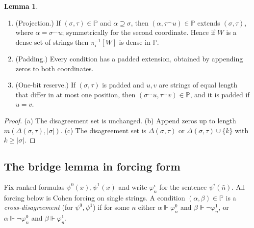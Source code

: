 \documentclass[11pt,letterpaper]{article}
\theoremstyle{definition}
\newtheorem{lemma}[definition]{Lemma}
\numberwithin{equation}{section}
\newcommand{\cat}{\mathbin{{}^\frown}}
\newcommand{\forces}{\Vdash}
\newcommand{\PP}{\mathbb P}
\begin{document}
\begin{lemma}\label{lem:forcingbasic}
\begin{enumerate}[label=\textup{(\alph*)}]
\item \textup{(Projection.)} If $(\sigma,\tau)\in\PP$ and $\alpha\supseteq\sigma$, then $(\alpha,\tau\cat u)\in\PP$ extends $(\sigma,\tau)$, where $\alpha=\sigma\cat u$; symmetrically for the second coordinate. Hence if $W$ is a dense set of strings then $\pi_i^{-1}[W]$ is dense in $\PP$.
\item \textup{(Padding.)} Every condition has a padded extension, obtained by appending zeros to both coordinates.
\item \textup{(One-bit reserve.)} If $(\sigma,\tau)$ is padded and $u,v$ are strings of equal length that differ in at most one position, then $(\sigma\cat u,\tau\cat v)\in\PP$, and it is padded if $u=v$.
\end{enumerate}
\end{lemma}
\begin{proof}
(a) The disagreement set is unchanged. (b) Append zeros up to length $m(\Delta(\sigma,\tau),|\sigma|)$. (c) The disagreement set is $\Delta(\sigma,\tau)$ or $\Delta(\sigma,\tau)\cup\{k\}$ with $k\ge|\sigma|$.
\end{proof}

\subsection{The bridge lemma in forcing form}
Fix ranked formulas $\psi^0(x),\psi^1(x)$ and write $\varphi^i_n$ for the sentence $\psi^i(\bar n)$. All forcing below is Cohen forcing on single strings. A condition $(\alpha,\beta)\in\PP$ is a \emph{cross-disagreement} (for $\psi^0,\psi^1$) if for some $n$ either $\alpha\forces\varphi^0_n$ and $\beta\forces\neg\varphi^1_n$, or $\alpha\forces\neg\varphi^0_n$ and $\beta\forces\varphi^1_n$.
\end{document}
